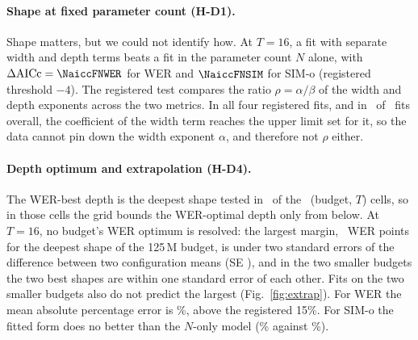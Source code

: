 \paragraph{Shape at fixed parameter count (H-D1).}
Shape matters, but we could not identify how. At $T{=}16$, a fit with separate width and
depth terms beats a fit in the parameter count $N$ alone, with
$\Delta\mathrm{AICc} = \NaiccFNWER$ for WER and $\NaiccFNSIM$ for SIM-o (registered
threshold $-4$). The registered test compares the ratio $\rho = \alpha/\beta$ of the width
and depth exponents across the two metrics. In all four registered fits, and in
\NcrsAmpFitsAtCap\ of \NcrsAmpFits\ fits overall, the coefficient of the width term reaches
the upper limit set for it, so the data cannot pin down the width exponent $\alpha$, and
therefore not $\rho$ either.

\paragraph{Depth optimum and extrapolation (H-D4).}
The WER-best depth is the deepest shape tested in \NcrsDeepCellsWER\ of the
\NcrsDepthCells\ (budget, $T$) cells, so in those cells the grid bounds the WER-optimal depth
only from below. At $T{=}16$, no budget's WER optimum is resolved: the largest margin,
\NcrsDstarMarginCWER\ WER points for the deepest shape of the 125\,M budget, is under two
standard errors of the difference between two configuration means (SE
\NcrsDstarSEdiffCWER), and in the two smaller budgets the two best shapes are within one
standard error of each other. Fits on the two smaller
budgets also do not predict the largest (Fig.~\ref{fig:extrap}). For WER the mean absolute percentage error is
\NmapeWER\%, above the registered 15\%. For SIM-o the fitted form does no better than the
$N$-only model (\NmapeSIM\% against \NmapeNSIM\%).
